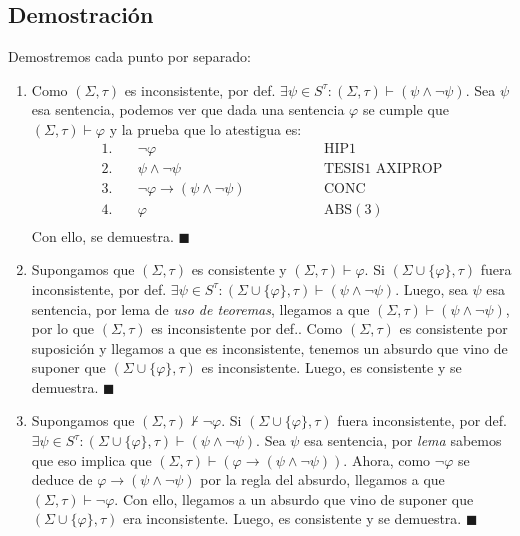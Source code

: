 \documentclass{article}
\begin{document}
\subsection*{Demostración}
Demostremos cada punto por separado:
\begin{enumerate}
  \item Como $(\Sigma,\tau)$ es inconsistente, por def. $\exists\psi\in S^\tau:(\Sigma,\tau)\vdash(\psi\land\neg\psi)$. Sea $\psi$ esa sentencia, podemos ver que dada una sentencia $\varphi$ se cumple que $(\Sigma,\tau)\vdash\varphi$ y la prueba que lo atestigua es:
        \begin{equation*}
          \begin{alignedat}{2}
            1.\quad & \neg\varphi                       &  & \qquad\qquad\text{HIP1}           \\
            2.\quad & \psi\land\neg\psi                 &  & \qquad\qquad\text{TESIS1 AXIPROP} \\
            3.\quad & \neg\varphi\to(\psi\land\neg\psi) &  & \qquad\qquad\text{CONC}           \\
            4.\quad & \varphi                           &  & \qquad\qquad\text{ABS}(3)         \\
          \end{alignedat}
        \end{equation*}
        Con ello, se demuestra. $\blacksquare$
  \item Supongamos que $(\Sigma,\tau)$ es consistente y $(\Sigma,\tau)\vdash\varphi$. Si $(\Sigma\cup\{\varphi\},\tau)$ fuera inconsistente, por def. $\exists\psi\in S^\tau:(\Sigma\cup\{\varphi\},\tau)\vdash(\psi\land\neg\psi)$. Luego, sea $\psi$ esa sentencia, por lema de \textit{uso de teoremas}, llegamos a que $(\Sigma,\tau)\vdash(\psi\land\neg\psi)$, por lo que $(\Sigma,\tau)$ es inconsistente por def.. Como $(\Sigma,\tau)$ es consistente por suposición y llegamos a que es inconsistente, tenemos un absurdo que vino de suponer que $(\Sigma\cup\{\varphi\},\tau)$ es inconsistente. Luego, es consistente y se demuestra. $\blacksquare$
  \item Supongamos que $(\Sigma,\tau)\nvdash\neg\varphi$. Si $(\Sigma\cup\{\varphi\},\tau)$ fuera inconsistente, por def. $\exists\psi\in S^\tau:(\Sigma\cup\{\varphi\},\tau)\vdash(\psi\land\neg\psi)$. Sea $\psi$ esa sentencia, por \textit{lema} sabemos que eso implica que $(\Sigma,\tau)\vdash(\varphi\to(\psi\land\neg\psi))$. Ahora, como $\neg\varphi$ se deduce de $\varphi\to(\psi\land\neg\psi)$ por la regla del absurdo, llegamos a que $(\Sigma,\tau)\vdash\neg\varphi$. Con ello, llegamos a un absurdo que vino de suponer que $(\Sigma\cup\{\varphi\},\tau)$ era inconsistente. Luego, es consistente y se demuestra. $\blacksquare$
\end{enumerate}
\end{document}

